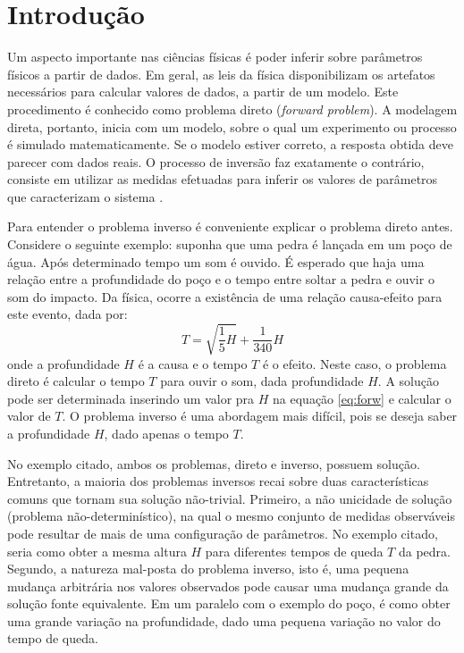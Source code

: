 \chapter{Introdução}
\label{cap:1intro}

Um aspecto importante nas ciências físicas é poder inferir sobre parâmetros
físicos a partir de dados. Em geral, as leis da física disponibilizam os
artefatos necessários para calcular valores de dados, a partir de um modelo.
Este procedimento é conhecido como problema direto (\textit{forward problem}).
A modelagem direta, portanto, inicia com um modelo, sobre o qual um experimento ou processo
é simulado matematicamente. Se o modelo estiver correto, a resposta
obtida deve parecer com dados reais. O processo de inversão faz exatamente o contrário,
consiste em utilizar as medidas efetuadas para inferir os valores de parâmetros que
caracterizam o sistema \citep{tarantola}.

Para entender o problema inverso é conveniente explicar o problema direto antes.
Considere o seguinte exemplo: suponha que uma pedra é lançada em um poço de água.
Após determinado tempo um som é ouvido. É esperado que haja uma relação entre a
profundidade do poço e o tempo entre soltar a pedra e ouvir o som do impacto. Da física,
ocorre a existência de uma relação causa-efeito para este evento, dada por:
\begin{equation}
\label{eq:forw}
T = \sqrt{\frac{1}{5}H} + \frac{1}{340}H
\end{equation}
onde a profundidade $H$ é a causa e o tempo $T$ é o efeito.
Neste caso, o problema direto é calcular o tempo $T$ para ouvir o som, dada profundidade $H$.
A solução pode ser determinada inserindo um valor pra $H$ na equação \ref{eq:forw} e calcular o
valor de $T$. O problema inverso é uma abordagem mais difícil, pois se deseja
saber a profundidade $H$, dado apenas o tempo $T$.

No exemplo citado, ambos os problemas, direto e inverso, possuem solução. Entretanto,
a maioria dos problemas inversos recai sobre duas características
comuns que tornam sua solução não-trivial. Primeiro, a não unicidade de solução
(problema não-determinístico), na qual o mesmo conjunto de medidas
observáveis pode resultar de mais de uma configuração de parâmetros. No exemplo
citado, seria como obter a mesma altura $H$ para diferentes tempos
de queda $T$ da pedra. Segundo, a natureza mal-posta do problema inverso, isto é,
uma pequena mudança arbitrária nos valores observados pode causar uma mudança grande
da solução fonte equivalente. Em um paralelo com o exemplo do poço, é como
obter uma grande variação na profundidade, dado uma pequena variação no valor do tempo de queda.

